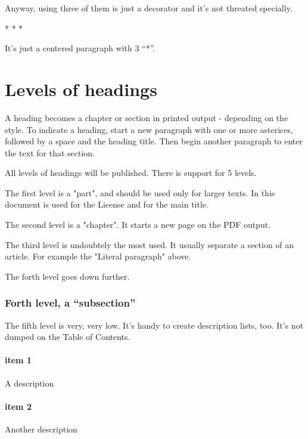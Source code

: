 \documentclass[DIV=12,%
               BCOR=0mm,%
               fontsize=10pt,%
               oneside,%
               paper=210mm:11in]{scrbook}
\begin{document}
Anyway, using three of them is just a decorator and it's not threated specially.



\begin{center}

* * *


\end{center}


It's just a centered paragraph with 3 “*”.

\chapter{Levels of headings}


A heading becomes a chapter or section in printed output - depending on
the style.  To indicate a heading, start a new paragraph with one or
more asterices, followed by a space and the heading title.  Then begin
another paragraph to enter the text for that section.


All levels of headings will be published. There is support for 5 levels.


The first level is a "part", and should be used only for larger texts. In this document is used for the License and for the main title.


The second level is a "chapter". It starts a new page on the PDF output.


The third level is undoubtely the most used. It usually separate a
section of an article. For example the "Literal paragraph" above.


The forth level goes down further.

\subsection{Forth level, a “subsection”}


The fifth level is very, very low. It's handy to create description
lists, too. It's not dumped on the Table of Contents.

\subsubsection{item 1}


A description

\subsubsection{item 2}


Another description
\end{document}

